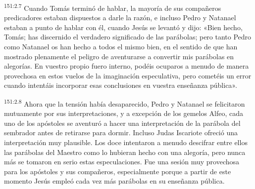 \par
\textsuperscript{151:2.7} Cuando Tomás terminó de hablar, la mayoría de sus compañeros predicadores estaban dispuestos a darle la razón, e incluso Pedro y Natanael estaban a punto de hablar con él, cuando Jesús se levantó y dijo: «Bien hecho, Tomás; has discernido el verdadero significado de las parábolas; pero tanto Pedro como Natanael os han hecho a todos el mismo bien, en el sentido de que han mostrado plenamente el peligro de aventurarse a convertir mis parábolas en alegorías. En vuestro propio fuero interno, podéis ocuparos a menudo de manera provechosa en estos vuelos de la imaginación especulativa, pero cometéis un error cuando intentáis incorporar esas conclusiones en vuestra enseñanza pública».

\par
\textsuperscript{151:2.8} Ahora que la tensión había desaparecido, Pedro y Natanael se felicitaron mutuamente por sus interpretaciones, y a excepción de los gemelos Alfeo, cada uno de los apóstoles se aventuró a hacer una interpretación de la parábola del sembrador antes de retirarse para dormir. Incluso Judas Iscariote ofreció una interpretación muy plausible. Los doce intentaron a menudo descifrar entre ellos las parábolas del Maestro como lo hubieran hecho con una alegoría, pero nunca más se tomaron en serio estas especulaciones. Fue una sesión muy provechosa para los apóstoles y sus compañeros, especialmente porque a partir de este momento Jesús empleó cada vez más parábolas en su enseñanza pública.

